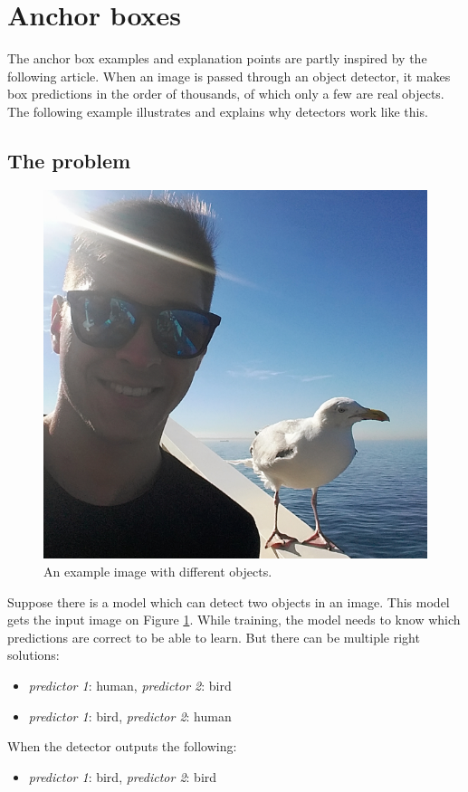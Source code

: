 \section{Anchor boxes}

The anchor box examples and explanation points are partly inspired by the following article\cite{AnchorBoxes}. When an image is passed through an object detector, it makes box predictions in the order of thousands, of which only a few are real objects. The following example illustrates and explains why detectors work like this.

\subsection{The problem}

\begin{figure}[htb]
 \centerline{\includegraphics[width=0.5\columnwidth]{.//Figure/Detector/human_bird.png}}
 \caption{An example image with different objects.}
 \label{fig:human_bird}
\end{figure}

Suppose there is a model which can detect two objects in an image. This model gets the input image on Figure \ref{fig:human_bird}. While training, the model needs to know which predictions are correct to be able to learn. But there can be multiple right solutions:

\begin{itemize}
  \item \textit{predictor 1}: human, \textit{predictor 2}: bird
  \item \textit{predictor 1}: bird, \textit{predictor 2}: human
\end{itemize}

When the detector outputs the following:

\begin{itemize}
  \item \textit{predictor 1}: bird, \textit{predictor 2}: bird
\end{itemize}

